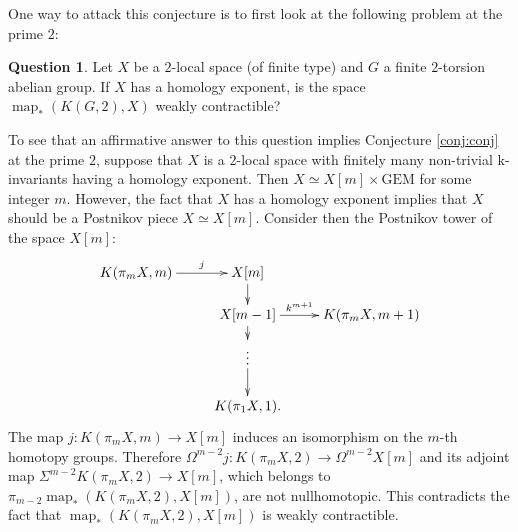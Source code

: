 \documentclass{amsart}
\theoremstyle{definition}
\newtheorem{quest}[thm]{Question}
\theoremstyle{remark}
\DeclareMathOperator{\map}{map}
\begin{document}
One way to attack this conjecture is to first look at the following problem at the prime $2$:

\begin{quest}
Let $X$ be a $2$-local space (of finite type) and $G$ a finite $2$-torsion abelian group. If $X$ has a homology exponent, is the space $\map_*(K(G,2),X)$ weakly contractible?
\end{quest}

To see that an affirmative answer to this question implies Conjecture \ref{conj:conj} at the prime $2$, suppose that $X$ is a $2$-local space with finitely many non-trivial k-invariants having a homology exponent. Then $X\simeq X[m]\times\text{GEM}$ for some integer $m$. However, the fact that $X$ has a homology exponent implies that $X$ should be a Postnikov piece $X\simeq X[m]$. Consider then the Postnikov tower of the space $X[m]$:
$$\xymatrix@R=0.5cm{
K(\pi_mX,m)\ar[r]^-j &X[m]\ar[d]\\
&X[m-1]\ar[d]\ar[r]^-{k^{m+1}} &K(\pi_mX,m+1)\\
&\vdots\ar[d]\\
&K(\pi_1X,1).
}$$ The map $j:K(\pi_m X,m)\to X[m]$ induces an isomorphism on the $m$-th homotopy groups. Therefore $\Omega^{m-2}j:K(\pi_m X,2)\to\Omega^{m-2}X[m]$ and its adjoint map $\Sigma^{m-2}K(\pi_m X,2)\to X[m]$, which belongs to $\pi_{m-2}\map_*(K(\pi_m X,2),X[m])$, are not nullhomotopic. This contradicts the fact that $\map_*(K(\pi_mX,2),X[m])$ is weakly contractible.


\end{document}
